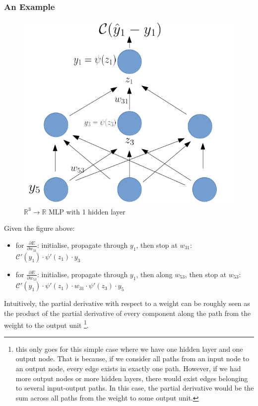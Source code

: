 \documentclass[a4paper,11pt]{article}
\begin{document}
\subsubsection{An Example}

\begin{figure}[h!]
	\centering
	\includegraphics[scale=0.4]{images/gradient_propagates.png}
	\caption{$\mathbb{R}^3 \rightarrow \mathbb{R}$ MLP with 1 hidden layer}
\end{figure}

Given the figure above:
\begin{itemize}
\renewcommand\labelitemi{--}
\item for $\frac{\partial{E}}{\partial{w_{31}}}$: initialise, propagate through $y_1$, then stop at $w_{31}$:
 $ \mathcal{\mathcal{C}}'(y_1) \cdot \psi'(z_1) \cdot y_3$ 
\item for $\frac{\partial{E}}{\partial{w_{53}}}$: initialise, propagate through $y_1$, then along $w_{53}$, then stop at $w_{53}$: \\
 $\mathcal{C}'(y_{1}) \cdot \psi'(z_1) \cdot w_{31} \cdot \psi'(z_3) \cdot y_5$ \\
\end{itemize}

Intuitively, the partial derivative with respect to a weight can be roughly seen as the product of the partial derivative of every component along the path from the weight to the output unit \footnote{this only goes for this simple case where we have one hidden layer and one output node. That is because, if we consider all paths from an input node to an output node, every edge exists in exactly one path. However, if we had more output nodes or more hidden layers, there would exist edges belonging to several input-output paths. In this case, the partial derivative would be the sum across all paths from the weight to some output unit.}. \\
\end{document}
